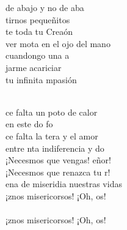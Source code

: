 \begin{cancion}
	de abajo y no de aba\\
	tirnos pequeñitos \\
	te toda tu Creaón\\
	 ver mota en el ojo del mano \\
	cuandongo una a\\
	jarme acariciar\\
	 tu infinita mpasión\\\jump\\
	\begin{chorus}%
	ce falta un poto de calor \\
	en este do fo\\
	ce falta la tera y el amor \\
	entre nta indiferencia y do\\
	¡Necesmos que vengas! eñor!\\
	¡Necesmos que renazca tu r!\\
	ena de miseridia nuestras vidas\\
	¡znos misericorsos! ¡Oh, os! \\
\jump\\
	¡znos misericorsos! ¡Oh, os! \\
	\end{chorus}%
	\jump\\
\end{cancion}%
